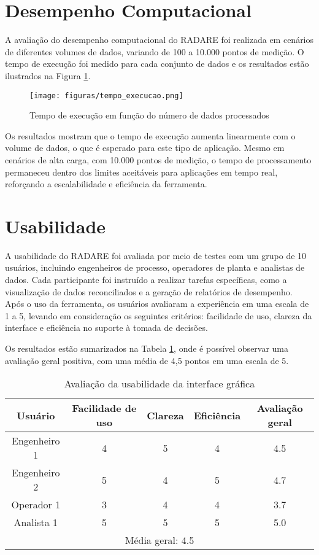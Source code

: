 \section{Desempenho Computacional}
\label{Sec:DesempenhoComputacional}

A avaliação do desempenho computacional do RADARE foi realizada em cenários de diferentes volumes de dados, variando de 100 a 10.000 pontos de medição. O tempo de execução foi medido para cada conjunto de dados e os resultados estão ilustrados na Figura \ref{Fig:TempoExecucao}.

\begin{figure}[htbp]
    \centering
    \texttt{[image: figuras/tempo\_execucao.png]}
    \caption{Tempo de execução em função do número de dados processados}
    \label{Fig:TempoExecucao}
\end{figure}

Os resultados mostram que o tempo de execução aumenta linearmente com o volume de dados, o que é esperado para este tipo de aplicação. Mesmo em cenários de alta carga, com 10.000 pontos de medição, o tempo de processamento permaneceu dentro dos limites aceitáveis para aplicações em tempo real, reforçando a escalabilidade e eficiência da ferramenta.

\section{Usabilidade}
\label{Sec:Usabilidade}

A usabilidade do RADARE foi avaliada por meio de testes com um grupo de 10 usuários, incluindo engenheiros de processo, operadores de planta e analistas de dados. Cada participante foi instruído a realizar tarefas específicas, como a visualização de dados reconciliados e a geração de relatórios de desempenho. Após o uso da ferramenta, os usuários avaliaram a experiência em uma escala de 1 a 5, levando em consideração os seguintes critérios: facilidade de uso, clareza da interface e eficiência no suporte à tomada de decisões.

Os resultados estão sumarizados na Tabela \ref{Tab:Usabilidade}, onde é possível observar uma avaliação geral positiva, com uma média de 4,5 pontos em uma escala de 5.

\begin{table}[htbp]
    \centering
    \caption{Avaliação da usabilidade da interface gráfica}
    \label{Tab:Usabilidade}
    \begin{tabular}{|c|c|c|c|c|}
        \hline
        Usuário & Facilidade de uso & Clareza & Eficiência & Avaliação geral \\ \hline
        Engenheiro 1 & 4 & 5 & 4 & 4.5 \\ \hline
        Engenheiro 2 & 5 & 4 & 5 & 4.7 \\ \hline
        Operador 1 & 3 & 4 & 4 & 3.7 \\ \hline
        Analista 1 & 5 & 5 & 5 & 5.0 \\ \hline
        \multicolumn{5}{|c|}{Média geral: 4.5} \\ \hline
    \end{tabular}
\end{table}

